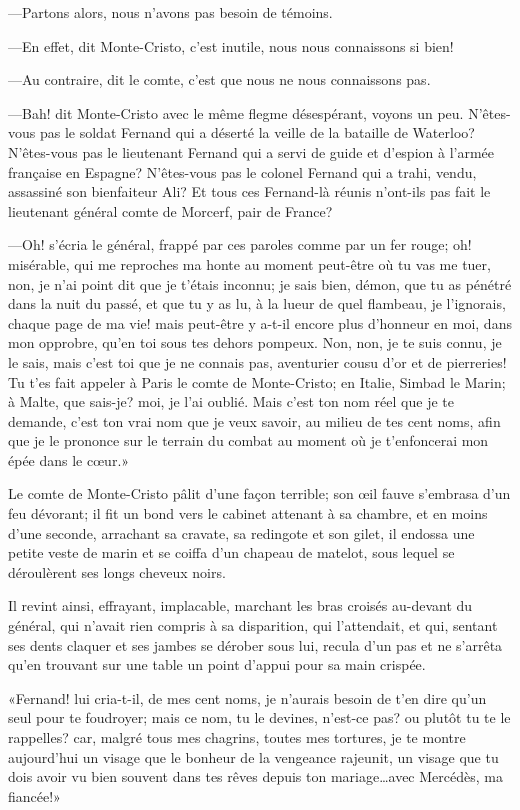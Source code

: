 —Partons alors, nous n'avons pas besoin de témoins. 

—En effet, dit Monte-Cristo, c'est inutile, nous nous connaissons si bien! 

—Au contraire, dit le comte, c'est que nous ne nous connaissons pas. 

—Bah! dit Monte-Cristo avec le même flegme désespérant, voyons un peu. N'êtes-vous pas le soldat Fernand qui a déserté la veille de la bataille de Waterloo? N'êtes-vous pas le lieutenant Fernand qui a servi de guide et d'espion à l'armée française en Espagne? N'êtes-vous pas le colonel Fernand qui a trahi, vendu, assassiné son bienfaiteur Ali? Et tous ces Fernand-là réunis n'ont-ils pas fait le lieutenant général comte de Morcerf, pair de France? 

—Oh! s'écria le général, frappé par ces paroles comme par un fer rouge; oh! misérable, qui me reproches ma honte au moment peut-être où tu vas me tuer, non, je n'ai point dit que je t'étais inconnu; je sais bien, démon, que tu as pénétré dans la nuit du passé, et que tu y as lu, à la lueur de quel flambeau, je l'ignorais, chaque page de ma vie! mais peut-être y a-t-il encore plus d'honneur en moi, dans mon opprobre, qu'en toi sous tes dehors pompeux. Non, non, je te suis connu, je le sais, mais c'est toi que je ne connais pas, aventurier cousu d'or et de pierreries! Tu t'es fait appeler à Paris le comte de Monte-Cristo; en Italie, Simbad le Marin; à Malte, que sais-je? moi, je l'ai oublié. Mais c'est ton nom réel que je te demande, c'est ton vrai nom que je veux savoir, au milieu de tes cent noms, afin que je le prononce sur le terrain du combat au moment où je t'enfoncerai mon épée dans le cœur.» 

Le comte de Monte-Cristo pâlit d'une façon terrible; son œil fauve s'embrasa d'un feu dévorant; il fit un bond vers le cabinet attenant à sa chambre, et en moins d'une seconde, arrachant sa cravate, sa redingote et son gilet, il endossa une petite veste de marin et se coiffa d'un chapeau de matelot, sous lequel se déroulèrent ses longs cheveux noirs. 

Il revint ainsi, effrayant, implacable, marchant les bras croisés au-devant du général, qui n'avait rien compris à sa disparition, qui l'attendait, et qui, sentant ses dents claquer et ses jambes se dérober sous lui, recula d'un pas et ne s'arrêta qu'en trouvant sur une table un point d'appui pour sa main crispée. 

«Fernand! lui cria-t-il, de mes cent noms, je n'aurais besoin de t'en dire qu'un seul pour te foudroyer; mais ce nom, tu le devines, n'est-ce pas? ou plutôt tu te le rappelles? car, malgré tous mes chagrins, toutes mes tortures, je te montre aujourd'hui un visage que le bonheur de la vengeance rajeunit, un visage que tu dois avoir vu bien souvent dans tes rêves depuis ton mariage\dots avec Mercédès, ma fiancée!» 

